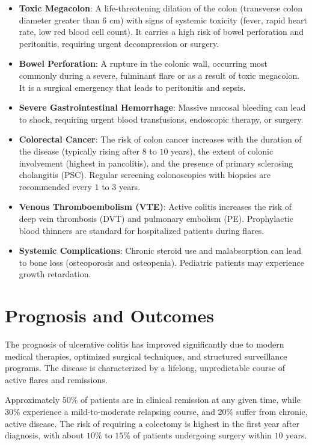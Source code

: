 \begin{itemize}
  \item \textbf{Toxic Megacolon}: A life-threatening dilation of the colon (transverse colon diameter greater than 6 cm) with signs of systemic toxicity (fever, rapid heart rate, low red blood cell count). It carries a high risk of bowel perforation and peritonitis, requiring urgent decompression or surgery.
  \item \textbf{Bowel Perforation}: A rupture in the colonic wall, occurring most commonly during a severe, fulminant flare or as a result of toxic megacolon. It is a surgical emergency that leads to peritonitis and sepsis.
  \item \textbf{Severe Gastrointestinal Hemorrhage}: Massive mucosal bleeding can lead to shock, requiring urgent blood transfusions, endoscopic therapy, or surgery.
  \item \textbf{Colorectal Cancer}: The risk of colon cancer increases with the duration of the disease (typically rising after $8$ to $10$ years), the extent of colonic involvement (highest in pancolitis), and the presence of primary sclerosing cholangitis (PSC). Regular screening colonoscopies with biopsies are recommended every $1$ to $3$ years.
  \item \textbf{Venous Thromboembolism (VTE)}: Active colitis increases the risk of deep vein thrombosis (DVT) and pulmonary embolism (PE). Prophylactic blood thinners are standard for hospitalized patients during flares.
  \item \textbf{Systemic Complications}: Chronic steroid use and malabsorption can lead to bone loss (osteoporosis and osteopenia). Pediatric patients may experience growth retardation.
\end{itemize}

\section*{Prognosis and Outcomes}
The prognosis of ulcerative colitis has improved significantly due to modern medical therapies, optimized surgical techniques, and structured surveillance programs. The disease is characterized by a lifelong, unpredictable course of active flares and remissions.

Approximately $50\%$ of patients are in clinical remission at any given time, while $30\%$ experience a mild-to-moderate relapsing course, and $20\%$ suffer from chronic, active disease. The risk of requiring a colectomy is highest in the first year after diagnosis, with about $10\%$ to $15\%$ of patients undergoing surgery within $10$ years.

